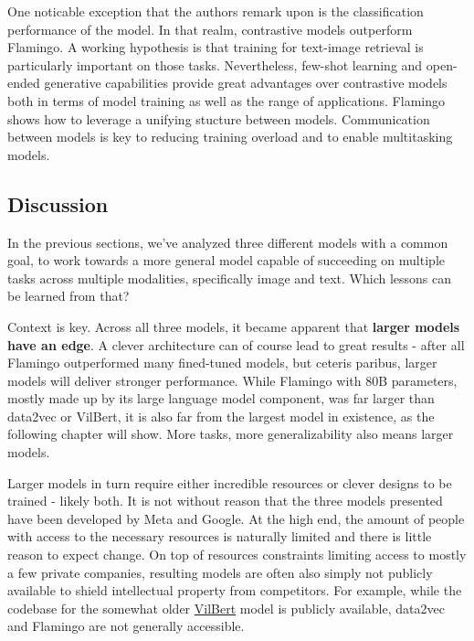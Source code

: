 \documentclass[
]{krantz}
\begin{document}
One noticable exception that the authors remark upon is the classification performance of the model. In that realm, contrastive models outperform Flamingo. A working hypothesis is that training for text-image retrieval is particularly important on those tasks. Nevertheless, few-shot learning and open-ended generative capabilities provide great advantages over contrastive models both in terms of model training as well as the range of applications. Flamingo shows how to leverage a unifying stucture between models. Communication between models is key to reducing training overload and to enable multitasking models.

\hypertarget{discussion-2}{%
\subsection{Discussion}\label{discussion-2}}

In the previous sections, we've analyzed three different models with a common goal,
to work towards a more general model capable of succeeding on multiple tasks across multiple modalities, specifically image and text. Which lessons can be learned from that?

Context is key.
Across all three models, it became apparent that \textbf{larger models have an edge}. A clever architecture can of course lead to great results - after all Flamingo outperformed many fined-tuned models, but ceteris paribus, larger models will deliver stronger performance. While Flamingo with 80B parameters, mostly made up by its large language model component, was far larger than data2vec or VilBert, it is also far from the largest model in existence, as the following chapter will show. More tasks, more generalizability also means larger models.

Larger models in turn require either incredible resources or clever designs to be trained -
likely both. It is not without reason that the three models presented have been developed by
Meta and Google. At the high end, the amount of people with access to the necessary resources is naturally limited and there is little reason to expect change. On top of resources constraints limiting access to mostly a few private companies, resulting models are often also simply not publicly available to shield intellectual property from competitors. For example, while the codebase for the somewhat older \href{https://github.com/facebookresearch/vilbert-multi-task}{VilBert} model is publicly available, data2vec and Flamingo are not generally accessible.
\end{document}
